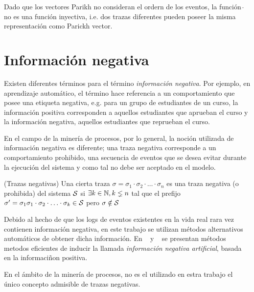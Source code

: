 Dado que los vectores Parikh no consideran el ordern de los eventos, la función \mbox{$\widehat{\ }$} no 
es una función inyectiva, i.e. dos trazas diferentes pueden poseer la misma representación como Parickh
vector.

\section{Información negativa} 
\label{sec:2.negative}

Existen diferentes términos para el término \textit{información negativa}. Por ejemplo, en aprendizaje automático,
el término hace referencia a un comportamiento que posee una etiqueta negativa, e.g. para un grupo
de estudiantes de un curso, la información positiva corresponden a aquellos estudiantes que aprueban el curso
y la información negativa, aquellos estudiantes que reprueban el curso. 

En el campo de la minería de procesos, por lo general, la noción utilizada de información negativa es diferente;
una traza negativa corresponde a un comportamiento prohibido, una secuencia de eventos que se desea 
evitar durante la ejecución del sistema y como tal no debe ser aceptado en el modelo.

\begin{definition}
    \label{def:neg}
    (Trazas negativas) Una cierta traza $\sigma=\sigma_1\cdot\sigma_2\cdot\ldots\cdot\sigma_n$ es
    una traza negativa (o prohibida) del sistema $\mathcal{S}$ si $\exists k \in \mathbb{N}, k \lneq n$ tal que
    el prefijo $\sigma'=\sigma_1\sigma_1\cdot\sigma_2\cdot\ldots\cdot\sigma_k \in \mathcal{S}$ pero $\sigma \notin \mathcal{S}$
\end{definition}

Debido al hecho de que los logs de eventos existentes en la vida real rara vez contienen información negativa, 
en este trabajo se utilizan métodos alternativos automáticos de obtener dicha información. En ~\cite{Goedertier2009} 
y ~\cite{BrouckeWVB14} se presentan métodos metodos eficientes de inducir la llamada \textit{información negativa artificial},
basada en la informaciñon positiva. 

En el ámbito de la minería de procesos, no es el utilizado en estra trabajo el único
concepto admisible de trazas negativas. 

